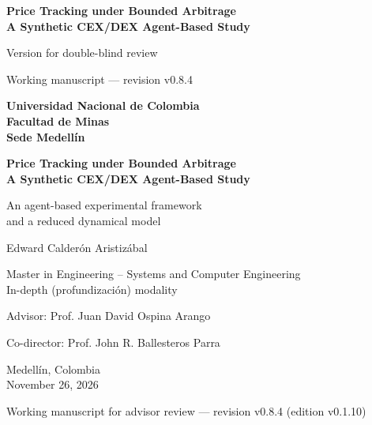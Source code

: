 \documentclass[11pt,letterpaper]{report}
\newcommand{\versionTesis}{v0.1.10}
\newcommand{\revisionManuscrito}{v0.8.4}
\numberwithin{equation}{chapter}
\begin{document}
\begin{titlepage}
  \thispagestyle{empty}
  \centering
  \singlespacing
  \ifdefined\blindreviewmode
  \vspace*{4cm}
  {\LARGE\bfseries Price Tracking under Bounded Arbitrage\\
  A Synthetic CEX/DEX Agent-Based Study\par}
  \vspace{1.2cm}
  {\Large Version for double-blind review\par}
  \vfill
  {\small Working manuscript --- revision \revisionManuscrito{}\par}
  \else
  {\large\bfseries Universidad Nacional de Colombia\\[2pt]
  Facultad de Minas\\[2pt]
  Sede Medellín\par}
  \vspace{3.2cm}
  {\LARGE\bfseries Price Tracking under Bounded Arbitrage\\
  A Synthetic CEX/DEX Agent-Based Study\par}
  \vspace{0.9cm}
  {\Large An agent-based experimental framework\\
  and a reduced dynamical model\par}
  \vspace{2.6cm}
  {\Large Edward Calderón Aristizábal\par}
  \vspace{1.6cm}
  {\large Master in Engineering -- Systems and Computer Engineering\\[2pt]
  In-depth (profundización) modality\par}
  \vspace{0.8cm}
  {\large Advisor: Prof. Juan David Ospina Arango\par}
  {\large Co-director: Prof. John R. Ballesteros Parra\par}
  \vfill
  {\large Medellín, Colombia\\[2pt]
  November 26, 2026\par}
  \vspace{0.3cm}
  {\small Working manuscript for advisor review --- revision \revisionManuscrito{} (edition \versionTesis{})\par}
  \fi
\end{titlepage}

\setcounter{page}{1}
\end{document}
